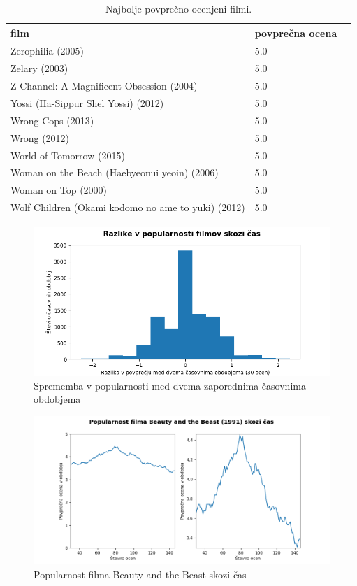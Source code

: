 \documentclass[a4paper,11pt]{article}
\begin{document}
\begin{table}[htbp]
\caption{Najbolje povprečno ocenjeni filmi.}
\label{tab2}
\begin{center}
\begin{tabular}{llp{3cm}}
\hline
film & povprečna ocena \\
\hline
Zerophilia (2005) & 5.0 \\
Zelary (2003) & 5.0 \\
Z Channel: A Magnificent Obsession (2004) & 5.0 \\
Yossi (Ha-Sippur Shel Yossi) (2012) & 5.0 \\
Wrong Cops (2013) & 5.0 \\
Wrong (2012) & 5.0 \\
World of Tomorrow (2015) & 5.0 \\
Woman on the Beach (Haebyeonui yeoin) (2006) & 5.0 \\
Woman on Top (2000) & 5.0 \\
Wolf Children (Okami kodomo no ame to yuki) (2012) & 5.0 \\
\hline
\end{tabular}
\end{center}
\end{table}

\begin{figure}[htbp]
\begin{center}
\includegraphics[scale=0.7]{popularityChangesHist.png}
\caption{Sprememba v popularnosti med dvema zaporednima časovnima obdobjema} \label{fig:img3}
\end{center}
\end{figure}

\begin{figure}[htbp]
\begin{center}
\includegraphics[scale=0.6]{595-beauty.png}
\caption{Popularnost filma Beauty and the Beast skozi čas} \label{fig:img5}
\end{center}
\end{figure}
\end{document}
